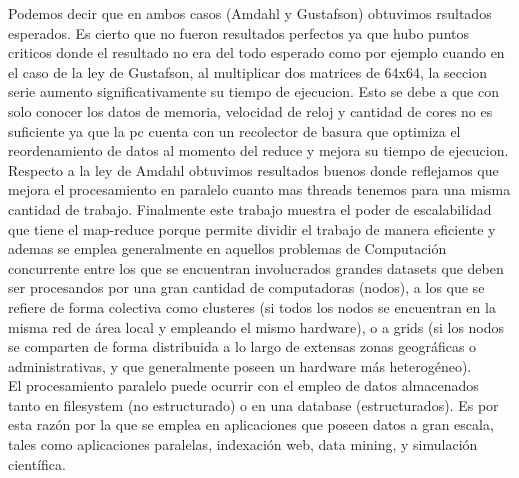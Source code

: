 Podemos decir que en ambos casos (Amdahl y Gustafson) obtuvimos rsultados
esperados. Es cierto que no fueron resultados perfectos ya que hubo puntos
criticos donde el resultado no era del todo esperado como por ejemplo cuando en
el caso de la ley de Gustafson, al multiplicar dos matrices de 64x64, la seccion
serie aumento significativamente su tiempo de ejecucion. Esto se debe a que con
solo conocer los datos de memoria, velocidad de reloj y cantidad de cores no es
suficiente ya que la pc cuenta con un recolector de basura que optimiza el
reordenamiento de datos al momento del reduce y mejora su tiempo de ejecucion.\\
Respecto a la ley de Amdahl obtuvimos resultados buenos donde reflejamos que
mejora el procesamiento en paralelo cuanto mas threads tenemos para una misma
cantidad de trabajo.
Finalmente este trabajo muestra el poder de escalabilidad que tiene el map-reduce
porque permite dividir el trabajo de manera eficiente y ademas se emplea
generalmente en aquellos problemas de Computación concurrente entre los que se
encuentran involucrados grandes datasets que deben ser procesandos por una gran
cantidad de computadoras (nodos), a los que se refiere de forma colectiva como
clusteres (si todos los nodos se encuentran en la misma red de área local y
empleando el mismo hardware), o a grids (si los nodos se comparten de forma
distribuida a lo largo de extensas zonas geográficas o administrativas, y que
generalmente poseen un hardware más heterogéneo). \\
El procesamiento paralelo puede ocurrir con el empleo de datos almacenados
tanto en filesystem (no estructurado) o en una database (estructurados).
Es por esta razón por la que se emplea en aplicaciones que poseen datos a
gran escala, tales como aplicaciones paralelas, indexación web, data mining, y
simulación científica.


